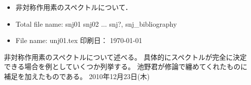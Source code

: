 \hide
\vspace{-4mm}
\begin{itemize} \itemsep=-2mm \parsep=0mm
\item 非対称作用素のスペクトルについて．
\item Total file name: snj01 snj02 $\dots $ snj?, snj\_bibliography
\item File name: unj01.tex \hfill 印刷日： \today \ \now
\end{itemize}
\endhide
%
\hide
非対称作用素のスペクトルについて述べる。
具体的にスペクトルが完全に決定できる場合を例としていくつか列挙する。
池野君が修論で纏めてくれたものに補足を加えたものである。
\hfill 2010年12月23日(木)
\endhide

